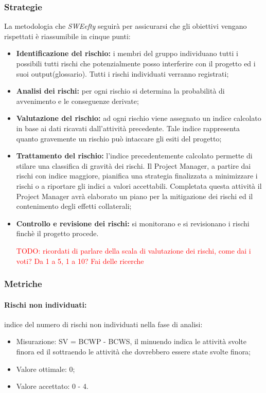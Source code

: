 \subsubsection{Strategie}
La metodologia che \textit{SWEefty} seguirà per assicurarsi che gli obiettivi vengano rispettati è riassumibile in cinque punti:
\begin{itemize}
	\item \textbf{Identificazione del rischio:} i membri del gruppo individuano tutti i possibili tutti rischi che potenzialmente posso interferire con il progetto ed i suoi output(glossario). Tutti i rischi individuati verranno registrati;

	\item \textbf{Analisi dei rischi: } per ogni rischio si determina la probabilità di avvenimento e le conseguenze derivate;

	\item \textbf{Valutazione del rischio: } ad ogni rischio viene assegnato un indice calcolato in base ai dati ricavati dall'attività precedente. Tale indice rappresenta quanto gravemente un rischio può intaccare gli esiti del progetto;

	\item \textbf{Trattamento del rischio: } l'indice precedentemente calcolato permette di stilare una classifica di gravità dei rischi. Il Project Manager, a partire dai rischi con indice maggiore, pianifica una strategia finalizzata a minimizzare i rischi o a riportare gli indici a valori accettabili. Completata questa attività il Project Manager avrà elaborato un piano per la mitigazione dei rischi ed il contenimento degli effetti collaterali;

	\item \textbf{Controllo e revisione dei rischi: } si monitorano e si revisionano i rischi finchè il progetto procede.

	\textcolor{red} {TODO: ricordati di parlare della scala di valutazione dei rischi, come dai i voti? Da 1 a 5, 1 a 10? Fai delle ricerche}
\end{itemize}
\subsubsection{Metriche}
\paragraph{Rischi non individuati:}
indice del numero di rischi non individuati nella fase di analisi:
	\begin{itemize}
		\item Misurazione: SV = BCWP - BCWS, il minuendo indica le attività svolte finora ed il sottraendo le attività che dovrebbero essere state svolte finora;
		\item Valore ottimale: 0;
		\item Valore accettato: 0 - 4.
	\end{itemize}


